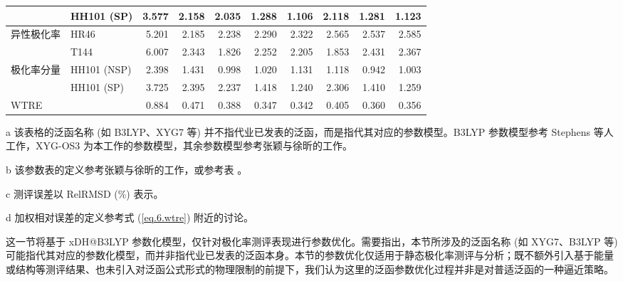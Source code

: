 \begin{table}
{\begin{tabular}{lld{2.7}d{2.7}d{2.7}d{2.7}d{2.7}d{2.7}d{2.7}d{2.7}}
    & HH101 (SP)  & 3.577      & 2.158      & 2.035      & 1.288      & 1.106     & 2.118    & 1.281      & 1.123      \\ \midrule
    异性极化率
    & HR46        & 5.201      & 2.185      & 2.238      & 2.290      &2.322     & 2.565    & 2.537      & 2.585      \\
    & T144        & 6.007      & 2.343      & 1.826      & 2.252      & 2.205     & 1.853    & 2.431      & 2.367      \\ \midrule
    极化率分量
    & HH101 (NSP) & 2.398      & 1.431      & 0.998      & 1.020      &1.131     & 1.118    & 0.942      & 1.003      \\
    & HH101 (SP)  & 3.725      & 2.395      & 2.237      & 1.418      & 1.240     & 2.306    & 1.410      & 1.259      \\ \midrule
    WTRE
                &             & 0.884      & 0.471      & 0.388      & 0.347      & 0.342     & 0.405    & 0.360      & 0.356      \\ \bottomrule
    \end{tabular}
}{
    \item[a] 该表格的泛函名称 (如 B3LYP、XYG7 等) 并不指代业已发表的泛函，而是指代其对应的参数模型。B3LYP 参数模型参考 Stephens 等人工作\cite{Stephens-Frisch.JPC.1994}，XYG-OS3 为本工作的参数模型，其余参数模型参考张颖与徐昕的工作\cite{Zhang-Xu.JPCL.2021}。
    \item[b] 该参数表的定义参考张颖与徐昕的工作\cite{Zhang-Xu.JPCL.2021}，或参考表 。
    \item[c] 测评误差以 RelRMSD (\%) 表示。
    \item[d] 加权相对误差的定义参考式 (\ref{eq.6.wtre}) 附近的讨论。
}
\end{table}

这一节将基于 xDH@B3LYP 参数化模型\cite{Zhang-Xu.JPCL.2021}，仅针对极化率测评表现进行参数优化。需要指出，本节所涉及的泛函名称 (如 XYG7、B3LYP 等) 可能指代其对应的参数化模型，而并非指代业已发表的泛函本身。本节的参数优化仅适用于静态极化率测评与分析；既不额外引入基于能量或结构等测评结果、也未引入对泛函公式形式的物理限制的前提下，我们认为这里的泛函参数优化过程并非是对普适泛函的一种逼近策略。

